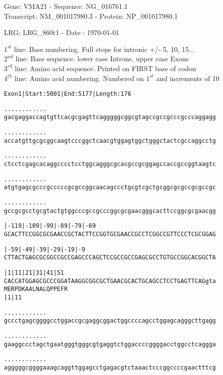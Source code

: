 \documentclass{article}
\begin{document}
\begin{center}
\begin{large}
Gene: VMA21 - Sequence: NG\_016761.1\\
Transcript: NM\_001017980.3 - Protein: NP\_001017980.1
 
LRG: LRG\_860t1 - Date : \today
{}
\end{large}
\end{center}
$1^{st}$ line: Base numbering. Full stops for intronic +/- 5, 10, 15...\\
$2^{nd}$ line: Base sequence. lower case Introns, upper case Exons\\
$3^{rd}$ line: Amino acid sequence. Printed on FIRST base of codon\\
$4^{th}$ line: Amino acid numbering. Numbered on $1^{st}$ and increments of 10\\
\begin{alltt}
Exon 1 | Start: 5001 | End: 5177 | Length: 176

.    .    .    .    .    .    .    .    .    .    .    .    
gacgaggaccagtgttcacgcgagttcagggggcggcgtagccgccgcccgcccaggagg

.    .    .    .    .    .    .    .    .    .    .    .    
accatgttgcgcggcaagtcccggctcaacgtggagtggctgggctactcgccaggcctg

.    .    .    .    .    .    .    .    .    .    .    .    
ctcctcgagcacaggcccctcctggcagggcgcacgccgcggagccaccgccggtaagtc

.    .    .    .    .    .    .    .    .    .    .    .    
atgtgagcgcccgcccccgcgccggcaacagccctgcgtcgctgcggcgcgccgcgccgc

.    .    .    .    .    .    .    .    .    .    .    .    
gccgcgcctgcgtactgtggcccgccgcccggcgcgaacgggcacttccggcgcgaacgg

     |-119     |-109     |-99      |-89      |-79      |-69 
GCACTTCCGGCGCGAACCGCTACTTCCGGTGCGAACCGCCTCGGCCGTTCCCTCGCGGAG

     |-59      |-49      |-39      |-29      |-19      |-9  
CTTACTGAGCGCGGCCGCCGAGCCCAGCTCCGCCGCCGAGCGCCTGTGCCGGCACGGCTA

    |1        |11       |21       |31       |41       |51   
CACCATGGAGCGCCCGGATAAGGCGGCGCTGAACGCACTGCAGCCTCCTGAGTTCAGgta
    M  E  R  P  D  K  A  A  L  N  A  L  Q  P  P  E  F  R    
    |1                            |11                       

 .    .    .    .    .    .    .    .    .    .    .    .   
gccctgagcggggcctggaccgcgaggcggactggccccagcctggagcagggcttgagg

 .    .    .    .    .    .    .    .    .    .    .    .   
gaaggccctagctgaatgggtgggcgtgaggtctggaccccggggacctggcctcaggga

 .    .    .    .    .    .    .    .    .    .    .    .   
agggggcggggaaagcaggttggagcctgagacgtctaaactcccggccccgaactttcg

\end{alltt}
\end{document}
